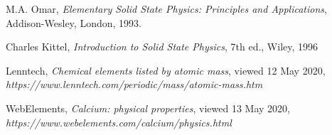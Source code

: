 \begin{thebibliography}{9}
    M.A. Omar, \textit{Elementary Solid State Physics:  
    Principles and Applications}, 
    Addison-Wesley, London, 1993.
    
    Charles Kittel, \textit{Introduction to Solid State Physics}, 7th ed.,
    Wiley, 1996

    Lenntech, \textit{Chemical elements listed by atomic mass}, viewed 12 May 2020,
    \textit{https://www.lenntech.com/periodic/mass/atomic-mass.htm}

    WebElements, \textit{Calcium: physical properties}, viewed 13 May 2020,
    \textit{https://www.webelements.com/calcium/physics.html}

\end{thebibliography}